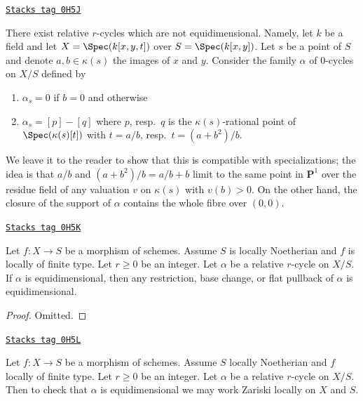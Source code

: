 \begin{example}
\label{relative-cycles-example-not-equidimensional}
\href{https://stacks.math.columbia.edu/tag/0H5J}{\texttt{Stacks tag 0H5J}}

\begin{reference}
\cite[Example 3.1.9]{SV}
\end{reference}
There exist relative $r$-cycles which are not equidimensional.
Namely, let $k$ be a field and let $X = \Spec(k[x, y, t])$
over $S = \Spec(k[x, y])$. Let $s$ be a point of $S$ and
denote $a, b \in \kappa(s)$ the images of $x$ and $y$.
Consider the family $\alpha$ of $0$-cycles on $X/S$ defined by
\begin{enumerate}
\item $\alpha_s = 0$ if $b = 0$ and otherwise
\item $\alpha_s = [p] - [q]$ where $p$, resp.\ $q$ is the $\kappa(s)$-rational
point of $\Spec(\kappa(s)[t])$ with $t = a/b$,
resp.\ $t = (a + b^2)/b$.
\end{enumerate}
We leave it to the reader to show that this is compatible with specializations;
the idea is that $a/b$ and $(a + b^2)/b = a/b + b$ limit to the same point
in $\mathbf{P}^1$ over the residue field of any valuation $v$ on $\kappa(s)$
with $v(b) > 0$. On the other hand, the closure of the support of $\alpha$
contains the whole fibre over $(0, 0)$.
\end{example}

\begin{lemma}
\label{relative-cycles-lemma-equidimensional-functoriality}
\href{https://stacks.math.columbia.edu/tag/0H5K}{\texttt{Stacks tag 0H5K}}

Let $f : X \to S$ be a morphism of schemes. Assume $S$ is locally Noetherian
and $f$ is locally of finite type. Let $r \geq 0$ be an integer. Let
$\alpha$ be a relative $r$-cycle on $X/S$. If $\alpha$ is equidimensional,
then any restriction, base change, or flat pullback of $\alpha$ is
equidimensional.
\end{lemma}

\begin{proof}
Omitted.
\end{proof}

\begin{lemma}
\label{relative-cycles-lemma-check-equidimensional}
\href{https://stacks.math.columbia.edu/tag/0H5L}{\texttt{Stacks tag 0H5L}}

Let $f : X \to S$ be a morphism of schemes. Assume $S$ locally Noetherian
and $f$ locally of finite type. Let $r \geq 0$ be an integer. Let $\alpha$
be a relative $r$-cycle on $X/S$. Then to check that $\alpha$ is equidimensional
we may work Zariski locally on $X$ and $S$.
\end{lemma}

